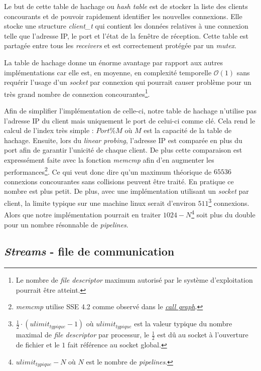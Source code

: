 \documentclass[../main.tex]{subfiles}
\begin{document}
Le but de cette table de hachage ou \textit{hash table} est de stocker la liste des clients concourants et de pouvoir rapidement identifier les nouvelles
connexions. Elle stocke une structure \textit{client\_t} qui contient les données relatives à une connexion telle que l'adresse IP, le port et l'état
de la fenêtre de réception. Cette table est partagée entre tous les \textit{receivers} et est correctement protégée par un \textit{mutex}.

La table de hachage donne un énorme avantage par rapport aux autres implémentations car elle est, en moyenne, en complexité temporelle $\mathcal{O}(1)$\cite{linear_probing}
sans requérir l'usage d'un \textit{socket} par connexion qui pourrait causer problème pour un très grand nombre de connexion concourantes\footnote{
    Le nombre de \textit{file descriptor} maximum autorisé par le système d'exploitation pourrait être atteint.}.

Afin de simplifier l'implémentation de celle-ci, notre table de hachage n'utilise pas l'adresse IP du client mais uniquement le port de celui-ci comme
clé. Cela rend le calcul de l'index très simple : $Port \% M$ où $M$ est la capacité de la table de hachage. Ensuite, lors du \textit{linear probing}, 
l'adresse IP est comparée en plus du port afin de garantir l'unicité de chaque client. De plus cette comparaison est expressément faite avec
la fonction \textit{memcmp} afin d'en augmenter les performances\footnote{ \textit{memcmp} utilise SSE 4.2 comme observé dans le \textit{\hyperref[sec:annexes_call_graph]{call graph}}.}.
Ce qui veut donc dire qu'un maximum théorique de $65536$ connexions concourantes sans collisions peuvent être traité. En pratique ce nombre
est plus petit. De plus, avec une implémentation utilisant un \textit{socket} par client, la limite typique sur une machine linux serait
d'environ $511$\footnote{ $\frac{1}{2} \cdot (ulimit_{typique} - 1)$ où $ulimit_{typique}$ est la valeur typique du nombre maximal de \textit{file descriptor} par processur,
 le $\frac{1}{2}$ est dû au socket à l'ouverture de fichier et le $1$ fait référence au socket global. } connexions. Alors
que notre implémentation pourrait en traiter $1024 - N$\footnote{ $ulimit_{typique} - N$ où $N$ est le nombre de \textit{pipelines}.} soit plus du double pour
un nombre résonnable de \textit{pipelines}.

\newpage

\subsection{\textit{Streams} - file de communication} 
\label{sec:steams}
\end{document}

